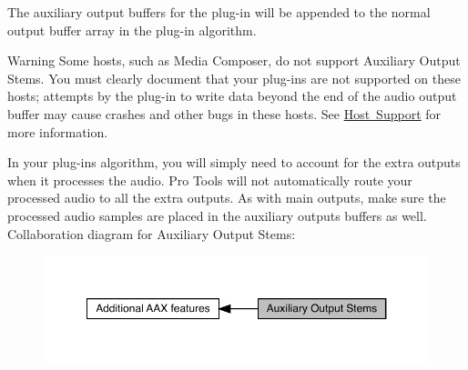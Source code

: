 \begin{DoxyCode}{0}
\DoxyCodeLine{\textcolor{comment}{// ***************************************************************************}}
\DoxyCodeLine{\textcolor{comment}{// ROUTINE: DescribeAlgorithmComponent}}
\DoxyCodeLine{\textcolor{comment}{// Algorithm component description}}
\DoxyCodeLine{\textcolor{comment}{// ***************************************************************************}}
\DoxyCodeLine{\{}
\DoxyCodeLine{            }
\DoxyCodeLine{    [...]}
\DoxyCodeLine{                                    \textcolor{stringliteral}{"My Auxiliary Output Channel"});}
\DoxyCodeLine{    [...]}
\DoxyCodeLine{\}   }
\end{DoxyCode}


The auxiliary output buffers for the plug-\/in will be appended to the normal output buffer array in the plug-\/in algorithm.

\begin{DoxyWarning}{Warning}
Some hosts, such as Media Composer, do not support Auxiliary Output Stems. You must clearly document that your plug-\/ins are not supported on these hosts; attempts by the plug-\/in to write data beyond the end of the audio output buffer may cause crashes and other bugs in these hosts. See \mbox{\hyperlink{a00845}{Host Support}} for more information.
\end{DoxyWarning}
In your plug-\/in\textquotesingle{}s algorithm, you will simply need to account for the extra outputs when it processes the audio. Pro Tools will not automatically route your processed audio to all the extra outputs. As with main outputs, make sure the processed audio samples are placed in the auxiliary outputs\textquotesingle{} buffers as well. Collaboration diagram for Auxiliary Output Stems\+:
\nopagebreak
\begin{figure}[H]
\begin{center}
\leavevmode
\includegraphics[width=350pt]{a00809}
\end{center}
\end{figure}
